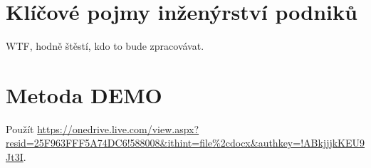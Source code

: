 \documentclass{szzclass}
\begin{document}
\tableofcontents
\newpage

\section{Klíčové pojmy inženýrství podniků}
WTF, hodně štěstí, kdo to bude zpracovávat.

\section{Metoda DEMO}
Použít \url{https://onedrive.live.com/view.aspx?resid=25F963FFF5A74DC6!588008&ithint=file%2cdocx&authkey=!ABkjjjkKEU9Jt3I}.
\end{document}
